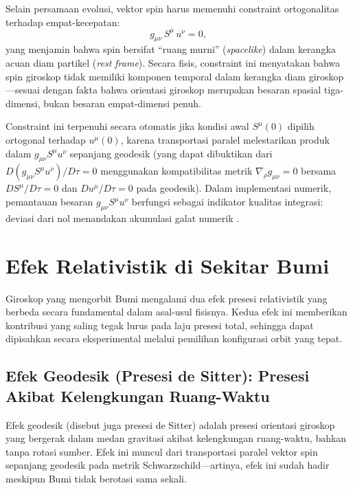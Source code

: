 Selain persamaan evolusi, vektor spin harus memenuhi constraint ortogonalitas terhadap empat-kecepatan:
\begin{equation}
    g_{\mu\nu}\, S^\mu\, u^\nu = 0,
    \label{eq:spin-constraint}
\end{equation}
yang menjamin bahwa spin bersifat ``ruang murni'' (\textit{spacelike}) dalam kerangka acuan diam partikel (\textit{rest frame}). Secara fisis, constraint ini menyatakan bahwa spin giroskop tidak memiliki komponen temporal dalam kerangka diam giroskop---sesuai dengan fakta bahwa orientasi giroskop merupakan besaran spasial tiga-dimensi, bukan besaran empat-dimensi penuh.

Constraint ini terpenuhi secara otomatis jika kondisi awal $S^\mu(0)$ dipilih ortogonal terhadap $u^\mu(0)$, karena transportasi paralel melestarikan produk dalam $g_{\mu\nu} S^\mu u^\nu$ sepanjang geodesik (yang dapat dibuktikan dari $D(g_{\mu\nu} S^\mu u^\nu)/D\tau = 0$ menggunakan kompatibilitas metrik $\nabla_\rho g_{\mu\nu} = 0$ bersama $DS^\mu/D\tau = 0$ dan $Du^\mu/D\tau = 0$ pada geodesik). Dalam implementasi numerik, pemantauan besaran $g_{\mu\nu} S^\mu u^\nu$ berfungsi sebagai indikator kualitas integrasi: deviasi dari nol menandakan akumulasi galat numerik \parencite{Carroll2004SpacetimeGeometry, Misner1973Gravitation}.


\section{Efek Relativistik di Sekitar Bumi}
\label{sec:efek-relativistik}

Giroskop yang mengorbit Bumi mengalami dua efek presesi relativistik yang berbeda secara fundamental dalam asal-usul fisisnya. Kedua efek ini memberikan kontribusi yang saling tegak lurus pada laju presesi total, sehingga dapat dipisahkan secara eksperimental melalui pemilihan konfigurasi orbit yang tepat.

\subsection{Efek Geodesik (Presesi de Sitter): Presesi Akibat Kelengkungan Ruang-Waktu}
\label{subsec:efek-geodesik}

Efek geodesik (disebut juga presesi de Sitter) adalah presesi orientasi giroskop yang bergerak dalam medan gravitasi akibat kelengkungan ruang-waktu, bahkan tanpa rotasi sumber. Efek ini muncul dari transportasi paralel vektor spin sepanjang geodesik pada metrik Schwarzschild---artinya, efek ini sudah hadir meskipun Bumi tidak berotasi sama sekali.

